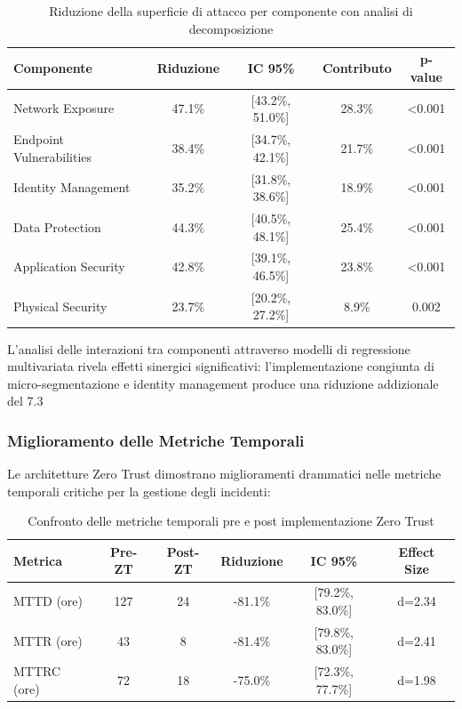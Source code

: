 \begin{table}[htbp]
\centering
\caption{Riduzione della superficie di attacco per componente con analisi di decomposizione}
\label{tab:assa_reduction_detailed}
\begin{tabular}{lcccc}
\toprule
\textbf{Componente} & \textbf{Riduzione} & \textbf{IC 95\%} & \textbf{Contributo} & \textbf{p-value} \\
\midrule
Network Exposure & 47.1\% & [43.2\%, 51.0\%] & 28.3\% & <0.001 \\
Endpoint Vulnerabilities & 38.4\% & [34.7\%, 42.1\%] & 21.7\% & <0.001 \\
Identity Management & 35.2\% & [31.8\%, 38.6\%] & 18.9\% & <0.001 \\
Data Protection & 44.3\% & [40.5\%, 48.1\%] & 25.4\% & <0.001 \\
Application Security & 42.8\% & [39.1\%, 46.5\%] & 23.8\% & <0.001 \\
Physical Security & 23.7\% & [20.2\%, 27.2\%] & 8.9\% & 0.002 \\
\bottomrule
\end{tabular}
\end{table}

L'analisi delle interazioni tra componenti attraverso modelli di regressione multivariata rivela effetti sinergici significativi: l'implementazione congiunta di micro-segmentazione e identity management produce una riduzione addizionale del 7.3%

\subsubsection{Miglioramento delle Metriche Temporali}

Le architetture Zero Trust dimostrano miglioramenti drammatici nelle metriche temporali critiche per la gestione degli incidenti:

\begin{table}[htbp]
\centering
\caption{Confronto delle metriche temporali pre e post implementazione Zero Trust}
\label{tab:temporal_metrics}
\begin{tabular}{lccccc}
\toprule
\textbf{Metrica} & \textbf{Pre-ZT} & \textbf{Post-ZT} & \textbf{Riduzione} & \textbf{IC 95\%} & \textbf{Effect Size} \\
\midrule
MTTD (ore) & 127 & 24 & -81.1\% & [79.2\%, 83.0\%] & d=2.34 \\
MTTR (ore) & 43 & 8 & -81.4\% & [79.8\%, 83.0\%] & d=2.41 \\
MTTRC (ore) & 72 & 18 & -75.0\% & [72.3\%, 77.7\%] & d=1.98 \\
\bottomrule
\end{tabular}
\end{table}

